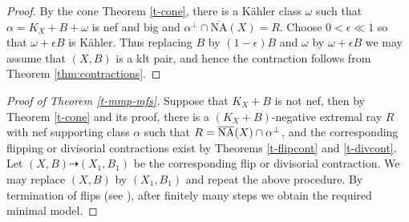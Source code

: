 \documentclass[12pt]{amsart}
\theoremstyle{plain}
\theoremstyle{remark}
\theoremstyle{definition}
\def\NA{\overline{\operatorname{NA}}}
\newcommand{\<}{\leq}
\def\eps{\epsilon}
\def\NA{\operatorname{\overline{NA}}}
\theoremstyle{definition}
\theoremstyle{definition}
\numberwithin{equation}{section}
\theoremstyle{remark}
\begin{document}
\begin{proof}
    By the cone Theorem \ref{t-cone}, there is a K\"ahler class $\omega$ such that $\alpha=K_X+B+\omega$  is nef and big and $\alpha^\bot\cap\NA(X)=R$. Choose $0<\eps\ll 1$ so that $\omega+\eps B$ is K\"ahler. Thus replacing $B$ by $(1-\eps)B$ and $\omega$ by $\omega+\eps B$ we may assume that $(X, B)$ is a klt pair, and hence the contraction follows from Theorem \ref{thm:contractions}.
\end{proof}






\begin{proof}[Proof of Theorem \ref{t-mmp-mfs}] 
Suppose that $K_X+B$ is not nef, then by Theorem \ref{t-cone} and its proof, there is a $(K_X+B)$-negative extremal ray $R$ with nef supporting class $\alpha$ such that $R=\overline{\rm NA}(X)\cap \alpha ^\perp$, and the corresponding flipping or divisorial contractions exist by Theorems \ref{t-flipcont} and \ref{t-divcont}. Let $(X,B)\dasharrow (X_1,B_1)$ be the corresponding flip or divisorial contraction. We may replace $(X,B)$ by $(X_1,B_1)$ and repeat the above procedure. By termination of flips (see \cite[Theorem 3.3]{DO23}), after finitely many steps we obtain the required minimal model. 
\end{proof}




\end{document}
